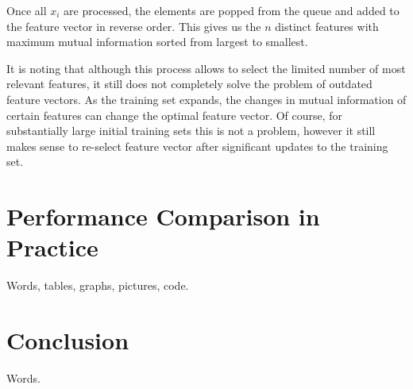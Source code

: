 \documentclass[12pt]{report}
\begin{document}
Once all $x_i$ are processed, the elements are popped from the queue and added to the feature vector in reverse order. This gives us the $n$ distinct features with maximum mutual information sorted from largest to smallest.

It is noting that although this process allows to select the limited number of most relevant features, it still does not completely solve the problem of outdated feature vectors. As the training set expands, the changes in mutual information of certain features can change the optimal feature vector. Of course, for substantially large initial training sets this is not a problem, however it still makes sense to re-select feature vector after significant updates to the training set.

\newpage


\chapter{Performance Comparison in Practice}

Words, tables, graphs, pictures, code.

\newpage


\chapter*{Conclusion}

Words.

\newpage


\end{document}
